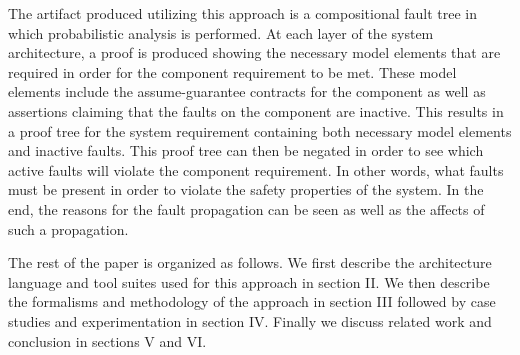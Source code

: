 The artifact produced utilizing this approach is a compositional fault tree in which probabilistic analysis is performed. At each layer of the system architecture, a proof is produced showing the necessary model elements that are required in order for the component requirement to be met. These model elements include the assume-guarantee contracts for the component as well as assertions claiming that the faults on the component are inactive. This results in a proof tree for the system requirement containing both necessary model elements and inactive faults. This proof tree can then be negated in order to see which active faults will violate the component requirement. In other words, what faults must be present in order to violate the safety properties of the system. In the end, the reasons for the fault propagation can be seen as well as the affects of such a propagation. 

The rest of the paper is organized as follows. We first describe the architecture language and tool suites used for this approach in section II. We then describe the formalisms and methodology of the approach in section III followed by case studies and experimentation in section IV. Finally we discuss related work and conclusion in sections V and VI.  
